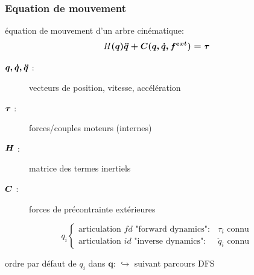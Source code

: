 \documentclass[10pt]{beamer}
\begin{document}
\begin{frame}

  \frametitle{Equation de mouvement}
  
  \begin{block}{équation de mouvement d'un arbre cinématique:}
  \begin{equation} \label{equ_equationMvt}
	H\boldsymbol{(q) \ddot{q} + C(q,\dot{q},f^{ext}) = \tau}
	\end{equation}
  \end{block}
  
  \begin{description}
    \item[$\boldsymbol{q, \dot{q}, \ddot{q}}$ :] vecteurs de position, vitesse, accélération
    \item[$\boldsymbol{\tau}$ :] forces/couples moteurs (internes)
    \item[$\boldsymbol{H}$ :] matrice des termes inertiels
    \item[$\boldsymbol{C}$ :] forces de précontrainte extérieures
  \end{description}
  
  \begin{equation*}
  q_i
  \begin{cases}
  \text{articulation $fd$ "forward dynamics"}: &\tau_i \text{ connu} \\
  \text{articulation $id$ "inverse dynamics"}: &\ddot{q}_i \text{ connu}
  \end{cases}
  \end{equation*}
  
  ordre par défaut de $q_i$ dans $\boldsymbol{q}$:
  $\hookrightarrow$ suivant parcours DFS
  

\end{frame}
\end{document}
